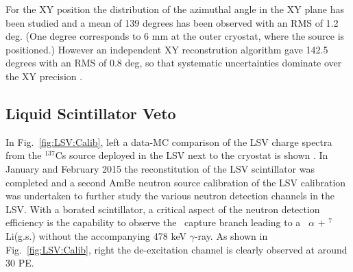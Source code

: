 For the XY position the distribution of the azimuthal angle in the XY plane has been studied and a mean of 139 degrees has been observed with an RMS of 1.2 deg. (One degree corresponds to 6 mm at the outer cryostat, where the source is positioned.) However an independent XY reconstrution algorithm gave 142.5 degrees with an RMS of 0.8 deg, so that systematic uncertainties dominate over the XY precision \cite{DS:XY:paper}.



\subsection{Liquid Scintillator Veto}\label{sec:LSV:gammasources}

In Fig.~\ref{fig:LSV:Calib}, left a data-MC comparison of the LSV charge spectra from the $^{137}$Cs source deployed in the LSV next to the cryostat is shown \cite{DS50:G4DS:paper}.
In January and February 2015 the reconstitution of the LSV scintillator was completed and a second AmBe neutron source calibration of the LSV calibration was undertaken to further study the various neutron detection channels in the LSV. With a borated scintillator, a critical aspect of the neutron detection efficiency is the capability to observe the \brbortenground\
capture branch leading to a \enbortengroundalpha\ $\alpha$ + $^7$Li(g.s.) without the accompanying 478 keV $\gamma$-ray. As shown in Fig.~\ref{fig:LSV:Calib}, right the de-excitation channel is clearly observed at around 30 PE.


